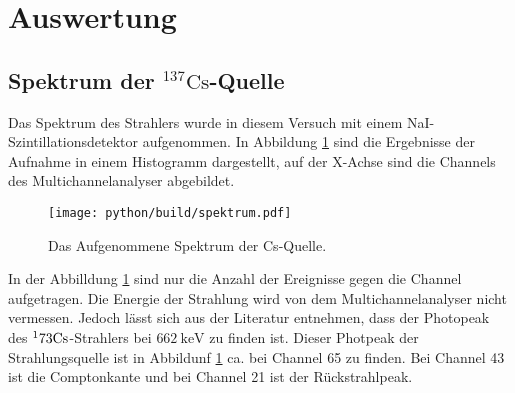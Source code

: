 \newpage 
\section{Auswertung}

  \subsection{Spektrum der $^137\text{Cs}$-Quelle}
    Das Spektrum des Strahlers wurde in diesem Versuch mit einem NaI-Szintillationsdetektor aufgenommen. 
    In Abbildung \ref{fig:Spektrum} sind die Ergebnisse der Aufnahme in einem Histogramm dargestellt, auf der X-Achse sind die Channels des Multichannelanalyser abgebildet.
    \begin{figure}[H]
      \centering  
      \texttt{[image: python/build/spektrum.pdf]}
      \label{fig:Spektrum}
      \caption{Das Aufgenommene Spektrum der Cs-Quelle.}
    \end{figure}

    \noindent In der Abbilldung \ref{fig:Spektrum} sind nur die Anzahl der Ereignisse gegen die Channel aufgetragen. 
    Die Energie der Strahlung wird von dem Multichannelanalyser nicht vermessen. 
    Jedoch lässt sich aus der Literatur \cite{Peak} entnehmen, dass der Photopeak des $^173\text{Cs}$-Strahlers bei $\SI{662}{\kilo\electronvolt}$ zu finden ist.
    Dieser Photpeak der Strahlungsquelle ist in Abbildunf \ref{fig:Spektrum} ca. bei Channel 65 zu finden. Bei Channel 43 ist die Comptonkante und bei Channel 21 ist der Rückstrahlpeak.

